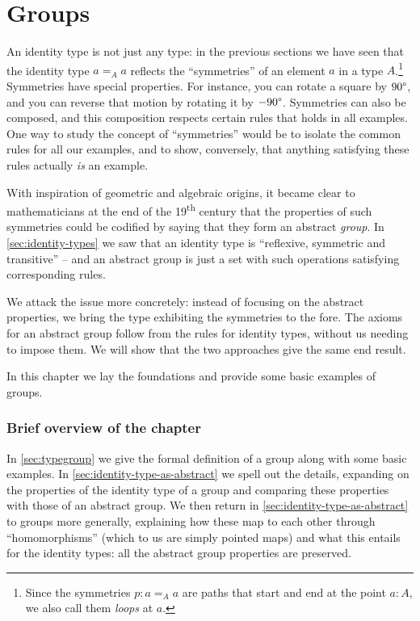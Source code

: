 \chapter{Groups}
\label{ch:groups}


An identity type is not just any type:  in the previous sections we have seen that the identity type $a=_Aa$ reflects the ``symmetries'' of an element $a$ in a type $A$.\footnote{%
  Since the symmetries $p : a=_A a$ are paths that start and end
  at the point $a:A$, we also call them \emph{loops} at $a$.\par
  }
Symmetries have special properties.  For instance, you can rotate a square by $90\textup{\textdegree}$, and you can reverse that motion by rotating it by $-90\textup{\textdegree}$.
Symmetries can also be composed, and this composition respects certain rules that holds in all examples.  One way to study the concept of ``symmetries'' would be to isolate the common rules for all our examples, and to show, conversely, that anything satisfying these rules actually \emph{is} an example.



With inspiration of geometric and algebraic origins, it became clear to mathematicians at the end of the 19\textsuperscript{th} century that the properties of such symmetries could be codified by saying that they form an abstract \emph{group}.
In \cref{sec:identity-types} we saw that an identity type is ``reflexive, symmetric and transitive'' -- and an abstract group is just a set with such operations satisfying corresponding rules.

We attack the issue more concretely:
instead of focusing on the abstract properties,
we bring the type exhibiting the symmetries to the fore.
The axioms for an abstract group follow from the rules for identity types,
without us needing to impose them.
We will show that the two approaches give the same end result.

In this chapter we lay the foundations and provide some basic examples of groups.

\subsection{Brief overview of the chapter}
In \cref{sec:typegroup} we give the formal definition of a group along with some basic examples.
In \cref{sec:identity-type-as-abstract} we spell out the details, expanding on the properties of the identity type of a group and comparing these properties with those of an abstract group.  We then return in \cref {sec:identity-type-as-abstract} to groups more generally, explaining how these map to each other through ``homomorphisms'' (which to us are simply pointed maps) and what this entails for the identity types: all the abstract group properties are preserved.

